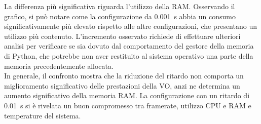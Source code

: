 La differenza più significativa riguarda l'utilizzo della RAM. Osservando il grafico, si può notare come la configurazione da \SI{0,001}{\second} abbia un consumo significativamente più elevato rispetto alle altre configurazioni, che presentano un utilizzo più contenuto. L'incremento osservato richiede di effettuare ulteriori analisi per verificare se sia dovuto dal comportamento del gestore della memoria di Python, che potrebbe non aver restituito al sistema operativo una parte della memoria precedentemente allocata.\\
In generale, il confronto mostra che la riduzione del ritardo non comporta un miglioramento significativo delle prestazioni della VO, anzi ne determina un aumento significativo della memoria RAM. La configurazione con un ritardo di \SI{0,01}{\second} si è rivelata un buon compromesso tra framerate, utilizzo CPU e RAM e temperature del sistema.